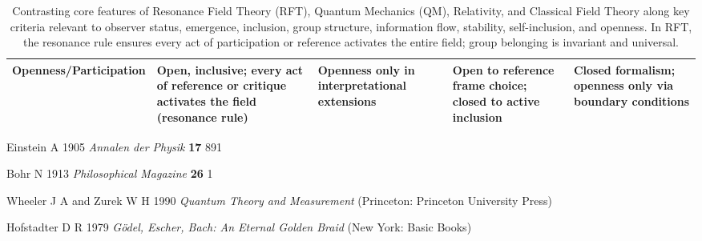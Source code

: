\documentclass[12pt]{article}
\begin{document}
\begin{table}[ht]
\begin{tabular}{|p{4cm}|p{3cm}|p{3cm}|p{3cm}|p{3cm}|}
			\hline
			\textbf{Openness/Participation} & Open, inclusive; every act of reference or critique activates the field (resonance rule) & Openness only in interpretational extensions & Open to reference frame choice; closed to active inclusion & Closed formalism; openness only via boundary conditions \\
			\hline
		\end{tabular}
		\caption{Contrasting core features of Resonance Field Theory (RFT), Quantum Mechanics (QM), Relativity, and Classical Field Theory along key criteria relevant to observer status, emergence, inclusion, group structure, information flow, stability, self-inclusion, and openness. In RFT, the resonance rule ensures every act of participation or reference activates the entire field; group belonging is invariant and universal.}
		\label{tab:rft_comparison}
	\end{table}
	
	\begin{thebibliography}{99}
		
		Einstein A 1905 \textit{Annalen der Physik} \textbf{17} 891
		
		Bohr N 1913 \textit{Philosophical Magazine} \textbf{26} 1
		
		Wheeler J A and Zurek W H 1990 \textit{Quantum Theory and Measurement} (Princeton: Princeton University Press)
		
		Hofstadter D R 1979 \textit{G\"odel, Escher, Bach: An Eternal Golden Braid} (New York: Basic Books)
		
		
	\end{thebibliography}

	
\end{document}
